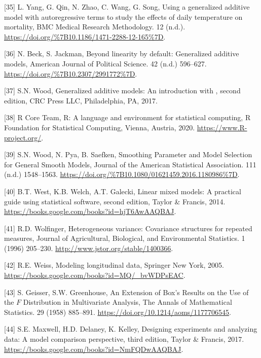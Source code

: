 \documentclass[
]{article}
\begin{document}
\leavevmode\hypertarget{ref-yang2012}{}%
{[}35{]} L. Yang, G. Qin, N. Zhao, C. Wang, G. Song, Using a generalized additive model with autoregressive terms to study the effects of daily temperature on mortality, BMC Medical Research Methodology. 12 (n.d.). \url{https://doi.org/\%7B10.1186/1471-2288-12-165\%7D}.

\leavevmode\hypertarget{ref-beck1998}{}%
{[}36{]} N. Beck, S. Jackman, Beyond linearity by default: Generalized additive models, American Journal of Political Science. 42 (n.d.) 596--627. \url{https://doi.org/\%7B10.2307/2991772\%7D}.

\leavevmode\hypertarget{ref-wood2017}{}%
{[}37{]} S.N. Wood, Generalized additive models: An introduction with , second edition, CRC Press LLC, Philadelphia, PA, 2017.

\leavevmode\hypertarget{ref-r}{}%
{[}38{]} R Core Team, R: A language and environment for statistical computing, R Foundation for Statistical Computing, Vienna, Austria, 2020. \url{https://www.R-project.org/}.

\leavevmode\hypertarget{ref-wood2016}{}%
{[}39{]} S.N. Wood, N. Pya, B. Saefken, Smoothing Parameter and Model Selection for General Smooth Models, Journal of the American Statistical Association. 111 (n.d.) 1548--1563. \url{https://doi.org/\%7B10.1080/01621459.2016.1180986\%7D}.

\leavevmode\hypertarget{ref-west2014}{}%
{[}40{]} B.T. West, K.B. Welch, A.T. Galecki, Linear mixed models: A practical guide using statistical software, second edition, Taylor \& Francis, 2014. \url{https://books.google.com/books?id=hjT6AwAAQBAJ}.

\leavevmode\hypertarget{ref-wolfinger1996}{}%
{[}41{]} R.D. Wolfinger, Heterogeneous variance: Covariance structures for repeated measures, Journal of Agricultural, Biological, and Environmental Statistics. 1 (1996) 205--230. \url{http://www.jstor.org/stable/1400366}.

\leavevmode\hypertarget{ref-weiss2005}{}%
{[}42{]} R.E. Weiss, Modeling longitudinal data, Springer New York, 2005. \url{https://books.google.com/books?id=MQ/_bvWDPsEAC}.

\leavevmode\hypertarget{ref-geisser1958}{}%
{[}43{]} S. Geisser, S.W. Greenhouse, An Extension of Box's Results on the Use of the \(F\) Distribution in Multivariate Analysis, The Annals of Mathematical Statistics. 29 (1958) 885--891. \url{https://doi.org/10.1214/aoms/1177706545}.

\leavevmode\hypertarget{ref-maxwell2017}{}%
{[}44{]} S.E. Maxwell, H.D. Delaney, K. Kelley, Designing experiments and analyzing data: A model comparison perspective, third edition, Taylor \& Francis, 2017. \url{https://books.google.com/books?id=NmFQDwAAQBAJ}.
\end{document}
